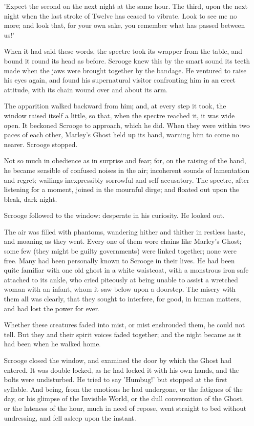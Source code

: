 'Expect the second on the next night at the same hour. The third, upon
the next night when the last stroke of Twelve has ceased to vibrate.
Look to see me no more; and look that, for your own sake, you remember
what has passed between us!'

When it had said these words, the spectre took its wrapper from the
table, and bound it round its head as before. Scrooge knew this by the
smart sound its teeth made when the jaws were brought together by the
bandage. He ventured to raise his eyes again, and found his supernatural
visitor confronting him in an erect attitude, with its chain wound over
and about its arm.


The apparition walked backward from him; and, at every step it took, the
window raised itself a little, so that, when the spectre reached it, it
was wide open. It beckoned Scrooge to approach, which he did. When they
were within two paces of each other, Marley's Ghost held up its hand,
warning him to come no nearer. Scrooge stopped.

Not so much in obedience as in surprise and fear; for, on the raising of
the hand, he became sensible of confused noises in the air; incoherent
sounds of lamentation and regret; wailings inexpressibly sorrowful and
self-accusatory. The spectre, after listening for a moment, joined in
the mournful dirge; and floated out upon the bleak, dark night.

Scrooge followed to the window: desperate in his curiosity. He looked
out.

The air was filled with phantoms, wandering hither and thither in
restless haste, and moaning as they went. Every one of them wore chains
like Marley's Ghost; some few (they might be guilty governments) were
linked together; none were free. Many had been personally known to
Scrooge in their lives. He had been quite familiar with one old ghost in
a white waistcoat, with a monstrous iron safe attached to its ankle, who
cried piteously at being unable to assist a wretched woman with an
infant, whom it saw below upon a doorstep. The misery with them all was
clearly, that they sought to interfere, for good, in human matters, and
had lost the power for ever.

Whether these creatures faded into mist, or mist enshrouded them, he
could not tell. But they and their spirit voices faded together; and
the night became as it had been when he walked home.

Scrooge closed the window, and examined the door by which the Ghost had
entered. It was double locked, as he had locked it with his own hands,
and the bolts were undisturbed. He tried to say 'Humbug!' but stopped at
the first syllable. And being, from the emotions he had undergone, or
the fatigues of the day, or his glimpse of the Invisible World, or the
dull conversation of the Ghost, or the lateness of the hour, much in
need of repose, went straight to bed without undressing, and fell asleep
upon the instant.